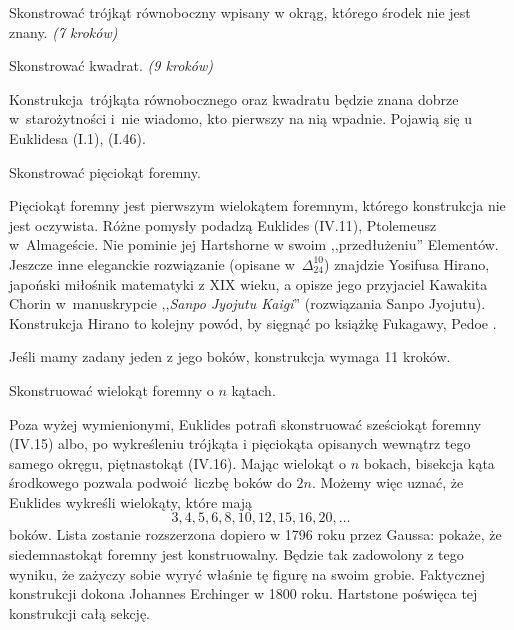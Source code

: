 \begin{problem}
    Skonstrować trójkąt równoboczny wpisany w okrąg, którego środek nie jest znany. \hfill \emph{(7 kroków)}
\end{problem}

\begin{problem}
    Skonstrować kwadrat. \hfill \emph{(9 kroków)}
\end{problem}

Konstrukcja trójkąta równobocznego oraz kwadratu będzie znana dobrze w~starożytności i~nie wiadomo, kto pierwszy na nią wpadnie.
Pojawią się u Euklidesa (I.1), (I.46).

\begin{problem}
    Skonstrować pięciokąt foremny.
\end{problem}

Pięciokąt foremny jest pierwszym wielokątem foremnym, którego konstrukcja nie jest oczywista.
Różne pomysły podadzą Euklides (IV.11), Ptolemeusz w~Almageście.
%
%
Nie pominie jej Hartshorne \cite[s. 45-49]{hartshorne2000} w swoim ,,przedłużeniu'' Elementów.
Jeszcze inne eleganckie rozwiązanie (opisane w~$\Delta_{24}^{10}$) znajdzie Yosifusa Hirano, japoński miłośnik matematyki z XIX wieku, a opisze jego przyjaciel Kawakita Chorin w~manuskrypcie ,,\emph{Sanpo Jyojutu Kaigi}'' (rozwiązania Sanpo Jyojutu).
%
Konstrukcja Hirano to kolejny powód, by sięgnąć po książkę Fukagawy, Pedoe \cite{fukagawa_1989}.

Jeśli mamy zadany jeden z jego boków, konstrukcja wymaga 11 kroków. %

\begin{problem}
    Skonstruować wielokąt foremny o $n$ kątach.
\end{problem}

Poza wyżej wymienionymi, Euklides potrafi skonstruować sześciokąt foremny (IV.15) albo, po wykreśleniu trójkąta i pięciokąta opisanych wewnątrz tego samego okręgu, piętnastokąt (IV.16).
%
Mając wielokąt o $n$ bokach, bisekcja kąta środkowego pozwala podwoić liczbę boków do $2n$.
Możemy więc uznać, że Euklides wykreśli wielokąty, które mają
\begin{equation}
    3, 4, 5, 6, 8, 10, 12, 15, 16, 20, \ldots
\end{equation}
boków.
Lista zostanie rozszerzona dopiero w 1796 roku przez Gaussa: pokaże, że siedemnastokąt foremny jest konstruowalny.
%
%
Będzie tak zadowolony z tego wyniku, że zażyczy sobie wyryć właśnie tę figurę na swoim grobie.
Faktycznej konstrukcji dokona Johannes Erchinger w 1800 roku.
%
Hartstone \cite[s. 250-259]{hartshorne2000} poświęca tej konstrukcji całą sekcję.

